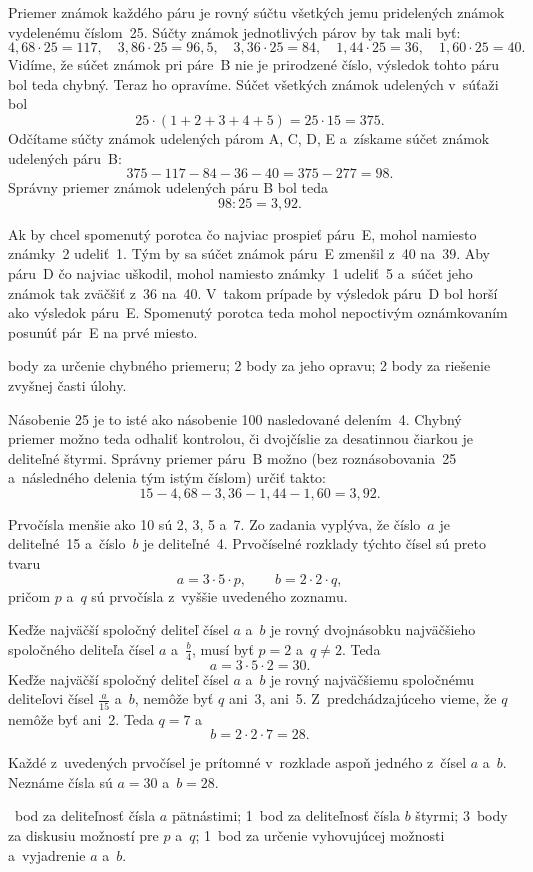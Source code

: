 {%
Priemer známok každého páru je rovný súčtu všetkých jemu pridelených známok vydelenému číslom~25.
Súčty známok jednotlivých párov by tak mali byť:
$$
4{,}68\cdot25=117,\quad
3{,}86\cdot25=96{,}5,\quad
3{,}36\cdot25=84,\quad
1{,}44\cdot25=36,\quad
1{,}60\cdot25=40.
$$
Vidíme, že súčet známok pri páre~B nie je prirodzené číslo, výsledok tohto páru bol teda chybný.
Teraz ho opravíme.
Súčet všetkých známok udelených v~súťaži bol
$$
25\cdot(1+2+3+4+5)=25\cdot15=375.
$$
Odčítame súčty známok udelených párom A, C, D, E a~získame súčet známok
udelených páru~B:
$$
375-117-84-36-40=375-277=98.
$$
Správny priemer známok udelených páru B bol teda
$$
98:25=3{,}92.
$$

Ak by chcel spomenutý porotca čo najviac prospieť páru~E, mohol namiesto známky~2 udeliť~1.
Tým by sa súčet známok páru~E zmenšil z~40 na~39.
Aby páru~D čo najviac uškodil, mohol namiesto známky~1 udeliť~5 a~súčet jeho známok tak zväčšiť z~36 na~40.
V~takom prípade by výsledok páru~D bol horší ako výsledok páru~E.
Spomenutý porotca teda mohol nepoctivým oznámkovaním posunúť pár~E na prvé miesto.

 body za určenie chybného priemeru;
2 body za jeho opravu;
2 body za riešenie zvyšnej časti úlohy.
\endhodnotenie

\poznamka
Násobenie 25 je to isté ako násobenie 100 nasledované delením~4.
Chybný priemer možno teda odhaliť kontrolou, či dvojčíslie za desatinnou čiarkou je deliteľné štyrmi.
Správny priemer páru~B možno (bez roznásobovania~25 a~následného delenia tým istým číslom) určiť takto:
$$
15-4{,}68-3{,}36-1{,}44-1{,}60=3{,}92.
$$
}

{%
Prvočísla menšie ako 10 sú 2, 3, 5 a~7.
Zo zadania vyplýva, že číslo~$a$ je deliteľné~15 a~číslo~$b$ je deliteľné~4.
Prvočíselné rozklady týchto čísel sú preto tvaru
$$
a=3\cdot 5\cdot p,\qquad b=2\cdot2\cdot q,
$$
pričom $p$ a~$q$ sú prvočísla z~vyššie uvedeného zoznamu.

Keďže najväčší spoločný deliteľ čísel $a$ a~$b$ je rovný dvojnásobku najväčšieho spoločného deliteľa čísel $a$ a~$\frac{b}4$, musí byť $p=2$ a~$q\ne2$.
Teda $$a=3\cdot5\cdot2=30.$$
Keďže najväčší spoločný deliteľ čísel $a$ a~$b$ je rovný najväčšiemu spoločnému deliteľovi čísel $\frac{a}{15}$ a~$b$, nemôže byť $q$ ani~3, ani~5.
Z~predchádzajúceho vieme, že $q$ nemôže byť ani~2.
Teda $q=7$ a~$$b=2\cdot2\cdot7=28.$$

Každé z~uvedených prvočísel je prítomné v~rozklade aspoň jedného z~čísel $a$ a~$b$.
Neznáme čísla sú $a=30$ a~$b=28$.

~bod za deliteľnosť čísla $a$ pätnástimi;
1~bod za deliteľnosť čísla $b$ štyrmi;
3~body za diskusiu možností pre $p$ a~$q$;
1~bod za určenie vyhovujúcej možnosti a~vyjadrenie $a$ a~$b$.
\endhodnotenie
}

